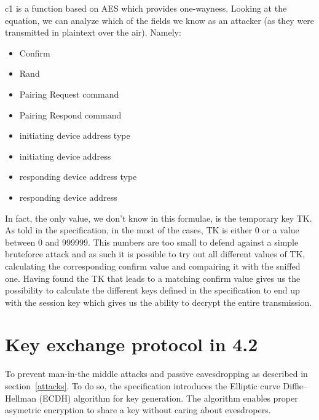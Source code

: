 \documentclass[conference]{IEEEtran}
\begin{document}
c1 is a function based on AES which provides one-wayness.
Looking at the equation, we can analyze which of the fields we know as an attacker (as they were transmitted in plaintext over the air). Namely:

\begin{itemize}
  \item Confirm
  \item Rand
  \item Pairing Request command
  \item Pairing Respond command
  \item initiating device address type
  \item initiating device address
  \item responding device address type
  \item responding device address
\end{itemize}

In fact, the only value, we don't know in this formulae, is the temporary key TK. As told in the specification, in the most of the cases, TK is either 0 or a value between 0 and 999999. This numbers are too small to defend against a simple bruteforce attack and as such it is possible to try out all different values of TK, calculating the corresponding confirm value and compairing it with the sniffed one. Having found the TK that leads to a matching confirm value gives us the possibility to calculate the different keys defined in the specification to end up with the session key which gives us the ability to decrypt the entire transmission.

\section{Key exchange protocol in 4.2}

To prevent man-in-the middle attacks and passive eavesdropping as described in section~\ref{attacks}. To do so, the specification introduces the Elliptic curve Diffie–Hellman (ECDH) algorithm for key generation. The algorithm enables proper asymetric encryption to share a key without caring about evesdropers.


\end{document}
